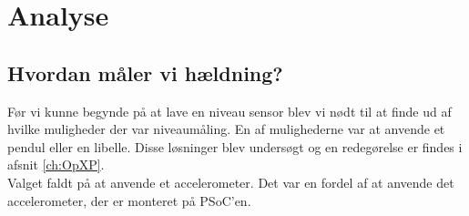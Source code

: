 \section{Analyse}
\subsection{Hvordan måler vi hældning?}
Før vi kunne begynde på at lave en niveau sensor blev vi nødt til at finde ud af hvilke muligheder der var niveaumåling. En af mulighederne var at anvende et pendul eller en libelle. Disse løsninger blev undersøgt og en redegørelse er findes i afsnit \ref{ch:OpXP}.\\
Valget faldt på at anvende et accelerometer. Det var en fordel af at anvende det accelerometer, der er monteret på PSoC'en.